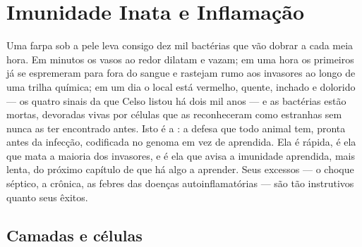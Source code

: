 \chapter{Imunidade Inata e Inflamação}\label{ch:b3:innate-immunity}

Uma farpa sob a pele leva consigo dez mil bactérias que vão dobrar a
cada meia hora. Em minutos os vasos ao redor dilatam e vazam; em uma
hora os primeiros  já se espremeram para fora do sangue e
rastejam rumo aos invasores ao longo de uma trilha química; em um dia o
local está vermelho, quente, inchado e dolorido --- os quatro sinais da
 que Celso listou há dois mil anos --- e as bactérias estão
mortas, devoradas vivas por células que as reconheceram como estranhas
sem nunca as ter encontrado antes. Isto é a : a defesa
que todo animal tem, pronta antes da infecção, codificada no genoma em
vez de aprendida. Ela é rápida, é ela que mata a maioria dos invasores,
e é ela que avisa a imunidade aprendida, mais lenta, do próximo
capítulo de que há algo a aprender. Seus excessos --- o choque séptico,
a  crônica, as febres das doenças autoinflamatórias --- são
tão instrutivos quanto seus êxitos.

\section{Camadas e células}

